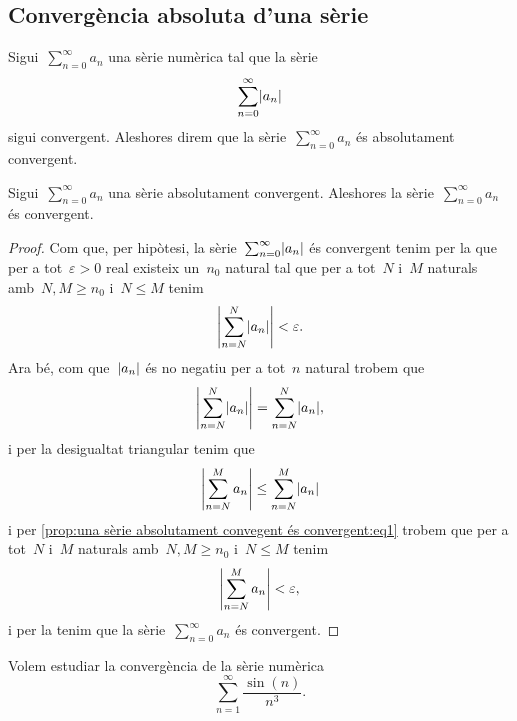 \documentclass[../../main.tex]{subfiles}
\begin{document}
    \subsection{Convergència absoluta d'una sèrie}
    \begin{definition}
        \label{def:convergència absoluta d'una sèrie}
        Sigui~\(\sum_{n=0}^{\infty}a_{n}\) una sèrie numèrica tal que la sèrie
        \[
            \sum_{n=0}^{\infty}\abs{a_{n}}
        \]
        sigui convergent.
        Aleshores direm que la sèrie~\(\sum_{n=0}^{\infty}a_{n}\) és absolutament convergent.
    \end{definition}
    \begin{proposition}
        \label{prop:una sèrie absolutament convergent és convergent}
        Sigui~\(\sum_{n=0}^{\infty}a_{n}\) una sèrie absolutament convergent.
        Aleshores la sèrie~\(\sum_{n=0}^{\infty}a_{n}\) és convergent.
    \end{proposition}
    \begin{proof}
        Com que, per hipòtesi, la sèrie~\(\sum_{n=0}^{\infty}\abs{a_{n}}\) és convergent tenim per la  que per a tot~\(\varepsilon>0\) real existeix un~\(n_{0}\) natural tal que per a tot~\(N\) i~\(M\) naturals amb~\(N,M\geq n_{0}\) i~\(N\leq M\) tenim
        \begin{equation}
            \label{prop:una sèrie absolutament convegent és convergent:eq1}
            \abs{\sum_{n=N}^{N}\abs{a_{n}}}<\varepsilon.
        \end{equation}
        Ara bé, com que~\(\abs{a_{n}}\) és no negatiu per a tot~\(n\) natural trobem que
        \[
            \abs{\sum_{n=N}^{N}\abs{a_{n}}}=\sum_{n=N}^{N}\abs{a_{n}},
        \]
        i per la desigualtat triangular %
        tenim que
        \[
            \abs{\sum_{n=N}^{M}a_{n}}\leq\sum_{n=N}^{M}\abs{a_{n}}
        \]
        i per \eqref{prop:una sèrie absolutament convegent és convergent:eq1} trobem que per a tot~\(N\) i~\(M\) naturals amb~\(N,M\geq n_{0}\) i~\(N\leq M\) tenim
        \[
            \abs{\sum_{n=N}^{M}a_{n}}<\varepsilon,
        \]
        i per la  tenim que la sèrie~\(\sum_{n=0}^{\infty}a_{n}\) és convergent.
    \end{proof}
    \begin{example}
        \label{ex:sèrie absolutament convergent}
        Volem estudiar la convergència de la sèrie numèrica
        \begin{equation}
            \label{ex:sèrie absolutament convergent:eq1}
            \sum_{n=1}^{\infty}\frac{\sin(n)}{n^{3}}.
        \end{equation}
    \end{example}
\end{document}
